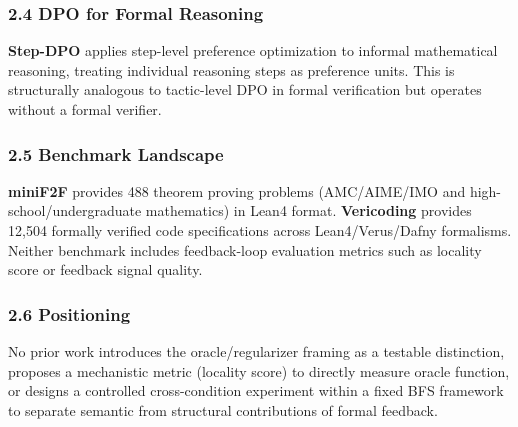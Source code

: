 \subsubsection{2.4 DPO for Formal Reasoning}

\textbf{Step-DPO} \citep{Laietal2024} applies step-level preference optimization to informal mathematical reasoning, treating individual reasoning steps as preference units. This is structurally analogous to tactic-level DPO in formal verification but operates without a formal verifier.

\subsubsection{2.5 Benchmark Landscape}

\textbf{miniF2F} \citep{Zhengetal2021} provides 488 theorem proving problems (AMC/AIME/IMO and high-school/undergraduate mathematics) in Lean4 format. \textbf{Vericoding} \citep{Bursucetal2025} provides 12,504 formally verified code specifications across Lean4/Verus/Dafny formalisms. Neither benchmark includes feedback-loop evaluation metrics such as locality score or feedback signal quality.

\subsubsection{2.6 Positioning}

No prior work introduces the oracle/regularizer framing as a testable distinction, proposes a mechanistic metric (locality score) to directly measure oracle function, or designs a controlled cross-condition experiment within a fixed BFS framework to separate semantic from structural contributions of formal feedback.
